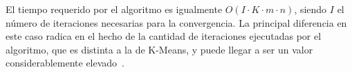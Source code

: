 El tiempo requerido por el algoritmo es igualmente $O(I\cdot K\cdot m\cdot n)$, siendo $I$ el número de iteraciones necesarias para la convergencia. La principal diferencia en este caso radica en el hecho de la cantidad de iteraciones ejecutadas por el algoritmo, que es distinta a la de K-Means, y puede llegar a ser un valor considerablemente elevado~\cite{Firdaus15,Park09}.
